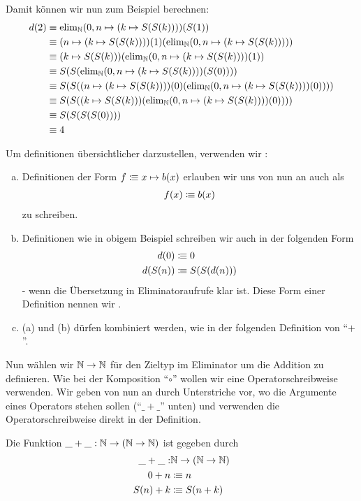 Damit können wir nun zum Beispiel berechnen:
\begin{align*}
  d(2)&\equiv \mathrm{elim}_{\mathbb{N}}(0,n\mapsto (k\mapsto S(S(k))))(S(1)) \\
      &\equiv (n\mapsto (k\mapsto S(S(k))))(1)(\mathrm{elim}_{\mathbb{N}}(0,n\mapsto (k\mapsto S(S(k))))) \\
      &\equiv (k\mapsto S(S(k)))(\mathrm{elim}_{\mathbb{N}}(0,n\mapsto (k\mapsto S(S(k))))(1)) \\
      &\equiv S(S(\mathrm{elim}_{\mathbb{N}}(0,n\mapsto (k\mapsto S(S(k))))(S(0)))) \\
      &\equiv S(S((n\mapsto (k\mapsto S(S(k))))(0)(\mathrm{elim}_{\mathbb{N}}(0,n\mapsto (k\mapsto S(S(k))))(0)))) \\
      &\equiv S(S((k\mapsto S(S(k)))(\mathrm{elim}_{\mathbb{N}}(0,n\mapsto (k\mapsto S(S(k))))(0)))) \\
      &\equiv S(S(S(S(0)))) \\
      &\equiv 4
\end{align*}

Um definitionen übersichtlicher darzustellen, verwenden wir :

\begin{konvention}
\begin{enumerate}[(a)]
\item Definitionen der Form $f\vcentcolon\mspace{-1.2mu}\equiv x\mapsto b(x)$ erlauben wir uns von nun an auch als
  \begin{align*}
    f(x)\vcentcolon\mspace{-1.2mu}\equiv b(x)
  \end{align*}
  zu schreiben. 
\item Definitionen wie in obigem Beispiel schreiben wir auch in der folgenden Form
  \begin{align*}
    d(0)&\vcentcolon\mspace{-1.2mu}\equiv 0 \\
    d(S(n))&\vcentcolon\mspace{-1.2mu}\equiv S(S(d(n))) 
  \end{align*}
  - wenn die Übersetzung in Eliminatoraufrufe klar ist.
  Diese Form einer Definition nennen wir .
\item (a) und (b) dürfen kombiniert werden, wie in der folgenden Definition von ``$+$''.
\end{enumerate}
\end{konvention}

Nun wählen wir $\mathbb{N}\to\mathbb{N}$ für den Zieltyp im Eliminator um die Addition zu definieren.
Wie bei der Komposition ``$\circ$'' wollen wir eine Operatorschreibweise verwenden.
Wir geben von nun an durch Unterstriche vor, wo die Argumente eines Operators stehen sollen (``$\_+\_$'' unten) und verwenden die Operatorschreibweise direkt in der Definition.
\begin{definition}
  Die Funktion $\_+\_:\mathbb{N}\to (\mathbb{N}\to \mathbb{N})$ ist gegeben durch
  \begin{align*}
    \_+\_:&\mathbb{N}\to (\mathbb{N}\to \mathbb{N}) \\
      0+n&\vcentcolon\mspace{-1.2mu}\equiv n \\
     S(n)+k&\vcentcolon\mspace{-1.2mu}\equiv S(n+k)
  \end{align*}
\end{definition}

